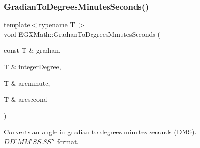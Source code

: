 \mbox{\label{group___e_g_x_math-_conversions-_angle_conversions-_gradian_ga5c81967ddb8f677634d161713174e419}} 
\subsubsection{\texorpdfstring{Gradian\+To\+Degrees\+Minutes\+Seconds()}{GradianToDegreesMinutesSeconds()}}
{\footnotesize\ttfamily template$<$typename T $>$ \\
void E\+G\+X\+Math\+::\+Gradian\+To\+Degrees\+Minutes\+Seconds (\begin{DoxyParamCaption}\item[{const T \&}]{gradian,  }\item[{T \&}]{integer\+Degree,  }\item[{T \&}]{arcminute,  }\item[{T \&}]{arcsecond }\end{DoxyParamCaption})}



Converts an angle in gradian to degrees minutes seconds (D\+MS). ${DD}^{\circ}{MM}'{SS.SS}''$ format. 


